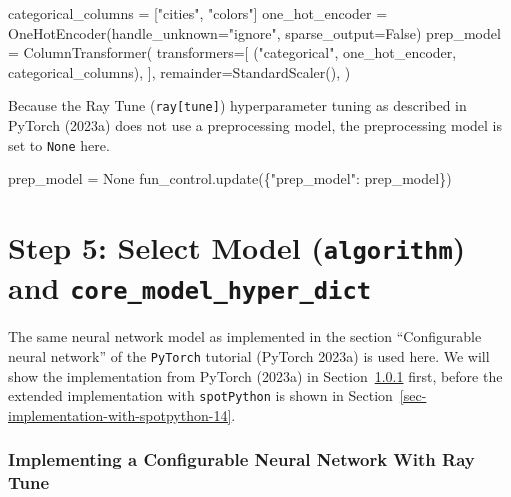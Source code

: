 \documentclass[
  letterpaper,
  DIV=11,
  numbers=noendperiod]{scrreprt}
\newenvironment{Shaded}{\begin{snugshade}}{\end{snugshade}}
\newcommand{\NormalTok}[1]{\textcolor[rgb]{0.00,0.23,0.31}{#1}}
\newcommand{\OperatorTok}[1]{\textcolor[rgb]{0.37,0.37,0.37}{#1}}
\newcommand{\StringTok}[1]{\textcolor[rgb]{0.13,0.47,0.30}{#1}}
\newcommand{\VariableTok}[1]{\textcolor[rgb]{0.07,0.07,0.07}{#1}}
\begin{document}
\begin{Shaded}
\begin{Highlighting}[]
\NormalTok{categorical\_columns = ["cities", "colors"]}
\NormalTok{one\_hot\_encoder = OneHotEncoder(handle\_unknown="ignore",}
\NormalTok{                                    sparse\_output=False)}
\NormalTok{prep\_model = ColumnTransformer(}
\NormalTok{        transformers=[}
\NormalTok{             ("categorical", one\_hot\_encoder, categorical\_columns),}
\NormalTok{         ],}
\NormalTok{         remainder=StandardScaler(),}
\NormalTok{     )}
\end{Highlighting}
\end{Shaded}

Because the Ray Tune (\texttt{ray{[}tune{]}}) hyperparameter tuning as
described in PyTorch (2023a) does not use a preprocessing model, the
preprocessing model is set to \texttt{None} here.

\begin{Shaded}
\begin{Highlighting}[]
\NormalTok{prep\_model }\OperatorTok{=} \VariableTok{None}
\NormalTok{fun\_control.update(\{}\StringTok{"prep\_model"}\NormalTok{: prep\_model\})}
\end{Highlighting}
\end{Shaded}

\hypertarget{sec-selection-of-the-algorithm-14}{%
\section{\texorpdfstring{Step 5: Select Model (\texttt{algorithm}) and
\texttt{core\_model\_hyper\_dict}}{Step 5: Select Model (algorithm) and core\_model\_hyper\_dict}}\label{sec-selection-of-the-algorithm-14}}

The same neural network model as implemented in the section
``Configurable neural network'' of the \texttt{PyTorch} tutorial
(PyTorch 2023a) is used here. We will show the implementation from
PyTorch (2023a) in Section~\ref{sec-implementation-with-raytune} first,
before the extended implementation with \texttt{spotPython} is shown in
Section~\ref{sec-implementation-with-spotpython-14}.

\hypertarget{sec-implementation-with-raytune}{%
\subsubsection{Implementing a Configurable Neural Network With Ray
Tune}\label{sec-implementation-with-raytune}}
\end{document}
